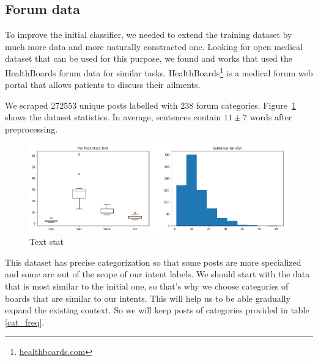 \documentclass[11pt]{article}
\begin{document}
\subsection{Forum data}
\label{subsec:forumdata}

To improve the initial classifier, we needed to extend the training
dataset by much more data and more naturally constracted one. Looking
for open medical dataset that can be used for this purpose, we found
\cite{zhang2015} and \cite{sondhi-EtAl:2010:POSTERS} works that used
the HealthBoards forum data for similar tasks. 
HealthBoards\footnote{\url{healthboards.com}} is a medical forum web portal that
allows patients to discuss their ailments.


We scraped 272553 unique posts labelled with 238 forum
categories. Figure~\ref{forum_data_stat} shows the dataset
statistics. In average, sentences contain $11\pm7$ words after
preprocessing.


 \begin{figure}[h]
 	\centering
 	\includegraphics[scale=0.4]{report3.png}
	\caption{Text stat}\label{forum_data_stat}
 \end{figure}
\FloatBarrier

This dataset has precise categorization so that some posts are more specialized and some are out of the scope of our intent labels. We should start with the data that is most similar to the initial one, so that's why we choose categories of boards that are similar to our intents. This will help us to be able gradually expand the existing context. So we will keep posts of categories provided in table \ref{cat_freq}.


\end{document}
